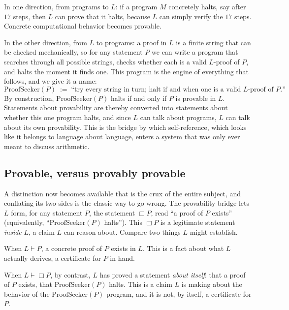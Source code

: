 \documentclass[10pt]{article}
\theoremstyle{definition}
\theoremstyle{remark}
\newcommand{\prov}{\vdash}            %
\newcommand{\Prov}{\Box}              %
\newcommand{\PS}{\mathrm{ProofSeeker}}
\begin{document}
In one direction, from programs to $L$: if a program $M$ concretely halts, say after $17$ steps, then $L$ can prove that it halts, because $L$ can simply verify the $17$ steps. Concrete computational behavior becomes provable.

In the other direction, from $L$ to programs: a proof in $L$ is a finite string that can be checked mechanically, so for any statement $P$ we can write a program that searches through all possible strings, checks whether each is a valid $L$-proof of $P$, and halts the moment it finds one. This program is the engine of everything that follows, and we give it a name:
\[
\PS(P) \;:=\; \text{``try every string in turn; halt if and when one is a valid $L$-proof of $P$.''}
\]
By construction, $\PS(P)$ halts if and only if $P$ is provable in $L$. Statements about provability are thereby converted into statements about whether this one program halts, and since $L$ can talk about programs, $L$ can talk about its own provability. This is the bridge by which self-reference, which looks like it belongs to language about language, enters a system that was only ever meant to discuss arithmetic.

\subsection{Provable, versus provably provable}
\label{sec:twosenses}

A distinction now becomes available that is the crux of the entire subject, and conflating its two sides is the classic way to go wrong. The provability bridge lets $L$ form, for any statement $P$, the statement $\Prov P$, read ``a proof of $P$ exists'' (equivalently, ``$\PS(P)$ halts''). This $\Prov P$ is a legitimate statement \emph{inside} $L$, a claim $L$ can reason about. Compare two things $L$ might establish.

When $L \prov P$, a concrete proof of $P$ exists in $L$. This is a fact about what $L$ actually derives, a certificate for $P$ in hand.

When $L \prov \Prov P$, by contrast, $L$ has proved a statement \emph{about itself}: that a proof of $P$ exists, that $\PS(P)$ halts. This is a claim $L$ is making about the behavior of the $\PS(P)$ program, and it is not, by itself, a certificate for $P$.
\end{document}
